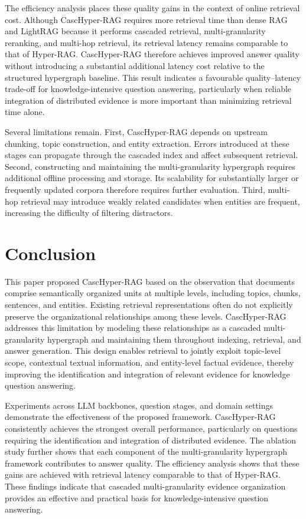 \documentclass[a4paper,fleqn]{cas-dc}
\begin{document}
The efficiency analysis places these quality gains in the context of online retrieval cost. Although CascHyper-RAG requires more retrieval time than dense RAG and LightRAG because it performs cascaded retrieval, multi-granularity reranking, and multi-hop retrieval, its retrieval latency remains comparable to that of Hyper-RAG. CascHyper-RAG therefore achieves improved answer quality without introducing a substantial additional latency cost relative to the structured hypergraph baseline. This result indicates a favourable quality–latency trade-off for knowledge-intensive question answering, particularly when reliable integration of distributed evidence is more important than minimizing retrieval time alone.

Several limitations remain. First, CascHyper-RAG depends on upstream chunking, topic construction, and entity extraction. Errors introduced at these stages can propagate through the cascaded index and affect subsequent retrieval. Second, constructing and maintaining the multi-granularity hypergraph requires additional offline processing and storage. Its scalability for substantially larger or frequently updated corpora therefore requires further evaluation. Third, multi-hop retrieval may introduce weakly related candidates when entities are frequent, increasing the difficulty of filtering distractors.

\section{Conclusion}\label{sec:conclusion}

This paper proposed CascHyper-RAG based on the observation that documents comprise semantically organized units at multiple levels, including topics, chunks, sentences, and entities. Existing retrieval representations often do not explicitly preserve the organizational relationships among these levels. CascHyper-RAG addresses this limitation by modeling these relationships as a cascaded multi-granularity hypergraph and maintaining them throughout indexing, retrieval, and answer generation. This design enables retrieval to jointly exploit topic-level scope, contextual textual information, and entity-level factual evidence, thereby improving the identification and integration of relevant evidence for knowledge question answering. 

Experiments across LLM backbones, question stages, and domain settings demonstrate the effectiveness of the proposed framework. CascHyper-RAG consistently achieves the strongest overall performance, particularly on questions requiring the identification and integration of distributed evidence. The ablation study further shows that each component of the multi-granularity hypergraph framework contributes to answer quality. The efficiency analysis shows that these gains are achieved with retrieval latency comparable to that of Hyper-RAG. These findings indicate that cascaded multi-granularity evidence organization provides an effective and practical basis for knowledge-intensive question answering.
\end{document}
